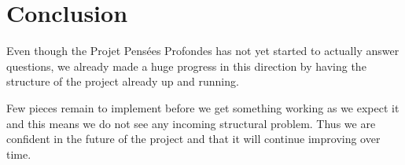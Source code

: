 \chapter{Conclusion}

Even though the Projet Pensées Profondes has not yet started to actually
answer questions, we already made a huge progress in this direction
by having the structure of the project already up and running.

Few pieces remain to implement before we get something working as we
expect it and this means we do not see any incoming structural problem.
Thus we are confident in the future of the project and that it will
continue improving over time.
